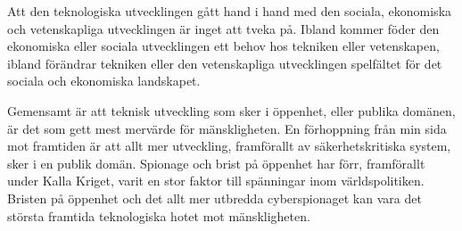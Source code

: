 \documentclass[a4paper,12pt,fleqn]{article}
\begin{document}
Att den teknologiska utvecklingen gått hand i hand med den sociala, ekonomiska och vetenskapliga utvecklingen är inget att tveka på. Ibland kommer föder den ekonomiska eller sociala utvecklingen ett behov hos tekniken eller vetenskapen, ibland förändrar tekniken eller den vetenskapliga utvecklingen spelfältet för det sociala och ekonomiska landskapet. 

Gemensamt är att teknisk utveckling som sker i öppenhet, eller publika domänen, är det som gett mest mervärde för mänskligheten. En förhoppning från min sida mot framtiden är att allt mer utveckling, framförallt av säkerhetskritiska system, sker i en publik domän. Spionage och brist på öppenhet har förr, framförallt under Kalla Kriget, varit en stor faktor till spänningar inom världspolitiken. Bristen på öppenhet och det allt mer utbredda cyberspionaget kan vara det största framtida teknologiska hotet mot mänskligheten. 


\newpage
{}

\listoffootnotes
\end{document}
